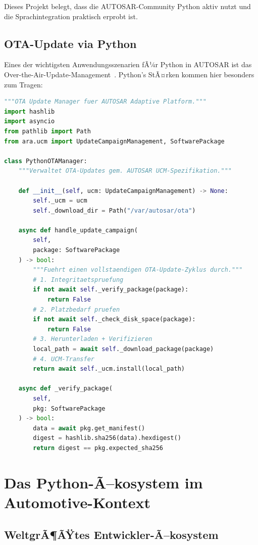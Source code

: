 ﻿\documentclass[12pt,a4paper,twoside]{article}
\begin{document}
Dieses Projekt belegt, dass die AUTOSAR-Community Python aktiv nutzt
und die Sprachintegration praktisch erprobt ist.

\subsection{OTA-Update via Python}
\label{subsec:ota}

Eines der wichtigsten Anwendungsszenarien fÃ¼r Python in AUTOSAR ist
das Over-the-Air-Update-Management~\cite{ota_autosar_ap2021}.
Python's StÃ¤rken kommen hier besonders zum Tragen:

\begin{lstlisting}[language=Python,caption={OTA-Update-Manager in Python (AUTOSAR AP)},label=lst:ota]
"""OTA Update Manager fuer AUTOSAR Adaptive Platform."""
import hashlib
import asyncio
from pathlib import Path
from ara.ucm import UpdateCampaignManagement, SoftwarePackage

class PythonOTAManager:
    """Verwaltet OTA-Updates gem. AUTOSAR UCM-Spezifikation."""
    
    def __init__(self, ucm: UpdateCampaignManagement) -> None:
        self._ucm = ucm
        self._download_dir = Path("/var/autosar/ota")
    
    async def handle_update_campaign(
        self,
        package: SoftwarePackage
    ) -> bool:
        """Fuehrt einen vollstaendigen OTA-Update-Zyklus durch."""
        # 1. Integritaetspruefung
        if not await self._verify_package(package):
            return False
        # 2. Platzbedarf pruefen
        if not await self._check_disk_space(package):
            return False
        # 3. Herunterladen + Verifizieren
        local_path = await self._download_package(package)
        # 4. UCM-Transfer
        return await self._ucm.install(local_path)
    
    async def _verify_package(
        self,
        pkg: SoftwarePackage
    ) -> bool:
        data = await pkg.get_manifest()
        digest = hashlib.sha256(data).hexdigest()
        return digest == pkg.expected_sha256
\end{lstlisting}

\section{Das Python-Ã–kosystem im Automotive-Kontext}
\label{sec:oekosystem}

\subsection{WeltgrÃ¶ÃŸtes Entwickler-Ã–kosystem}
\label{subsec:entwickler}
\end{document}
